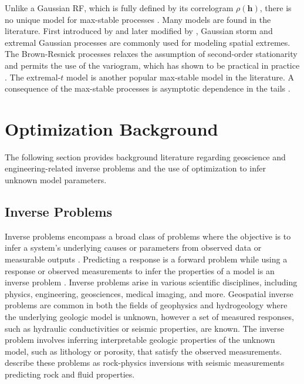 Unlike a Gaussian \gls{RF}, which is fully defined by its correlogram $\rho(\mathbf{h})$, there is no unique model for max-stable processes \citep{chiles2012geostatistics}. Many models are found in the literature. First introduced by \cite{smith1990maxstable} and later modified by \cite{schlather2002models}, Gaussian storm and extremal Gaussian processes are commonly used for modeling spatial extremes. The Brown-Resnick processes \citep{brown1977extreme,kabluchko2009stationary} relaxes the assumption of second-order stationarity and permits the use of the variogram, which has shown to be practical in practice \citep{gaume2013mapping}. The extremal-$t$ model \citep{opitz2013extremal} is another popular max-stable model in the literature. A consequence of the max-stable processes is asymptotic dependence in the tails \citep{davison2013geostatistics}.


\FloatBarrier
\section{Optimization Background}
\label{sec:01optreview}

The following section provides background literature regarding geoscience and engineering-related inverse problems and the use of optimization to infer unknown model parameters.

\FloatBarrier
\subsection{Inverse Problems}
\label{subsec:01inverse}

Inverse problems encompass a broad class of problems where the objective is to infer a system's underlying causes or parameters from observed data or measurable outputs \citep{sen2013global}. Predicting a response is a forward problem while using a response or observed measurements to infer the properties of a model is an inverse problem \citep{tarantola2005inverse}. Inverse problems arise in various scientific disciplines, including physics, engineering, geosciences, medical imaging, and more. Geospatial inverse problems are common in both the fields of geophysics \citep{linde2015geological,giraud2019integration,grana2022probabilistic} and hydrogeology \citep{zhou2014inverse,ghorbanidehno2020recent} where the underlying geologic model is unknown, however a set of measured responses, such as hydraulic conductivities or seismic properties, are known. The inverse problem involves inferring interpretable geologic properties of the unknown model, such as lithology or porosity, that satisfy the observed measurements. \cite{grana2022probabilistic} describe these problems as rock-physics inversions with seismic measurements predicting rock and fluid properties.

